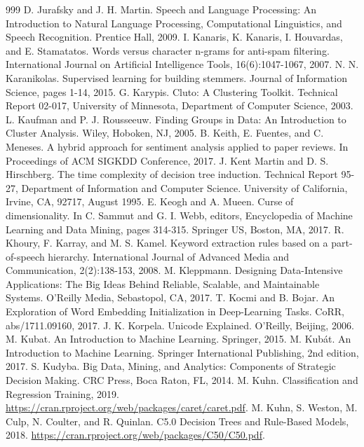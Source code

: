 \documentclass[11pt,openany,executivepaper]{book}
\begin{document}
\begin{thebibliography}{999}
 D. Jurafsky and J. H. Martin. Speech and Language Processing: An Introduction to Natural Language Processing, Computational Linguistics, and Speech Recognition. Prentice Hall, 2009.
 I. Kanaris, K. Kanaris, I. Houvardas, and E. Stamatatos. Words versus character n-grams for anti-spam filtering. International Journal on Artificial Intelligence Tools, 16(6):1047-1067, 2007.
 N. N. Karanikolas. Supervised learning for building stemmers. Journal of Information Science, pages 1-14, 2015.
 G. Karypis. Cluto: A Clustering Toolkit. Technical Report 02-017, University of Minnesota, Department of Computer Science, 2003.
 L. Kaufman and P. J. Rousseeuw. Finding Groups in Data: An Introduction to Cluster Analysis. Wiley, Hoboken, NJ, 2005.
 B. Keith, E. Fuentes, and C. Meneses. A hybrid approach for sentiment analysis applied to paper reviews. In Proceedings of ACM SIGKDD Conference, 2017.
 J. Kent Martin and D. S. Hirschberg. The time complexity of decision tree induction. Technical Report 95-27, Department of Information and Computer Science. University of California, Irvine, CA, 92717, August 1995.
 E. Keogh and A. Mueen. Curse of dimensionality. In C. Sammut and G. I. Webb, editors, Encyclopedia of Machine Learning and Data Mining, pages 314-315. Springer US, Boston, MA, 2017.
 R. Khoury, F. Karray, and M. S. Kamel. Keyword extraction rules based on a part-of-speech hierarchy. International Journal of Advanced Media and Communication, 2(2):138-153, 2008.
 M. Kleppmann. Designing Data-Intensive Applications: The Big Ideas Behind Reliable, Scalable, and Maintainable Systems. O'Reilly Media, Sebastopol, CA, 2017.
 T. Kocmi and B. Bojar. An Exploration of Word Embedding Initialization in Deep-Learning Tasks. CoRR, abs/1711.09160, 2017.
 J. K. Korpela. Unicode Explained. O'Reilly, Beijing, 2006.
 M. Kubat. An Introduction to Machine Learning. Springer, 2015.
 M. Kubát. An Introduction to Machine Learning. Springer International Publishing, 2nd edition, 2017.
 S. Kudyba. Big Data, Mining, and Analytics: Components of Strategic Decision Making. CRC Press, Boca Raton, FL, 2014.
 M. Kuhn. Classification and Regression Training, 2019. \url{https://cran.rproject.org/web/packages/caret/caret.pdf}.
 M. Kuhn, S. Weston, M. Culp, N. Coulter, and R. Quinlan. C5.0 Decision Trees and Rule-Based Models, 2018. \url{https://cran.rproject.org/web/packages/C50/C50.pdf}.

\end{thebibliography}
\end{document}
